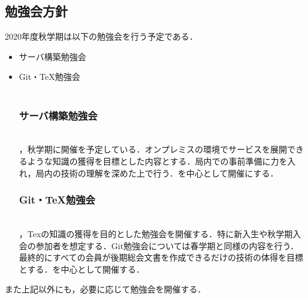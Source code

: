 \subsection*{勉強会方針}


2020年度秋学期は以下の勉強会を行う予定である．
\begin{itemize}
    \item サーバ構築勉強会
\item Git・TeX勉強会
\\\\
    \subsubsection*{サーバ構築勉強会}\\
    ，秋学期に開催を予定している．オンプレミスの環境でサービスを展開できるような知識の獲得を目標とした内容とする．局内での事前準備に力を入れ，局内の技術の理解を深めた上で行う．\secondGrade{}を中心として開催にする．
\subsubsection*{Git・TeX勉強会}\\
    ，Texの知識の獲得を目的とした勉強会を開催する．特に新入生や秋学期入会の参加者を想定する．Git勉強会については春学期と同様の内容を行う．最終的にすべての会員が後期総会文書を作成できるだけの技術の体得を目標とする．\secondgrade{}を中心として開催する．
\end{itemize}
また上記以外にも，必要に応じて勉強会を開催する．

